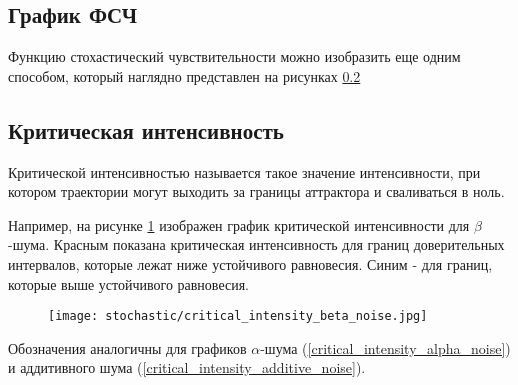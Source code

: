 

    \subsection{График ФСЧ}

        Функцию стохастический чувствительности можно изобразить еще одним способом, который наглядно представлен на рисунках \ref{} 


    \subsection{Критическая интенсивность}

        Критической интенсивностью называется такое значение интенсивности, при котором траектории могут выходить за границы аттрактора и сваливаться в ноль.

        Например, на рисунке \ref{critical_intensity_beta_noise} изображен график критической интенсивности для \(\beta\)-шума. Красным показана критическая интенсивность для границ доверительных интервалов, которые лежат ниже устойчивого равновесия. Синим - для границ, которые выше устойчивого равновесия. 



        \begin{figure}
            \centering
            \texttt{[image: stochastic/critical\_intensity\_beta\_noise.jpg]}
        
            \captionsetup{justification=centering}
            \caption{}
            \label{critical_intensity_beta_noise}
        \end{figure}
        
        Обозначения аналогичны для графиков \(\alpha\)-шума (\ref{critical_intensity_alpha_noise}) и аддитивного шума (\ref{critical_intensity_additive_noise}).

